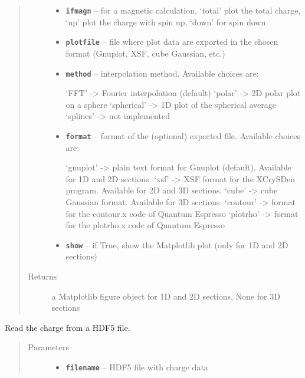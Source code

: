 \documentclass[letterpaper,10pt,english]{sphinxmanual}
\begin{document}
\begin{fulllineitems}
\begin{fulllineitems}
\begin{quote}
\begin{description}
\begin{itemize}
\item {} 
\textbf{\texttt{ifmagn}} -- for a magnetic calculation, `total' plot the total charge, `up' plot the charge with spin up,
`down' for spin down

\item {} 
\textbf{\texttt{plotfile}} -- file where plot data are exported in the chosen format (Gnuplot, XSF, cube Gaussian, etc.)

\item {} 
\textbf{\texttt{method}} -- 
interpolation method. Available choices are:

`FFT' -\textgreater{} Fourier interpolation (default)
`polar' -\textgreater{} 2D polar plot on a sphere
`spherical' -\textgreater{} 1D plot of the spherical average
`splines' -\textgreater{} not implemented


\item {} 
\textbf{\texttt{format}} -- 
format of the (optional) exported file. Available choices are:

`gnuplot' -\textgreater{} plain text format for Gnuplot (default). Available for 1D and 2D sections.
`xsf' -\textgreater{} XSF format for the XCrySDen program. Available for 2D and 3D sections.
`cube' -\textgreater{} cube Gaussian format. Available for 3D sections.
`contour' -\textgreater{} format for the contour.x code of Quantum Espresso
`plotrho' -\textgreater{} format for the plotrho.x code of Quantum Espresso


\item {} 
\textbf{\texttt{show}} -- if True, show the Matplotlib plot (only for 1D and 2D sections)

\end{itemize}

\item[{Returns}] \leavevmode
a Matplotlib figure object for 1D and 2D sections, None for 3D sections

\end{description}\end{quote}

\end{fulllineitems}


\begin{fulllineitems}
\label{postqe:postqe.charge.Charge.read}
Read the charge from a HDF5 file.
\begin{quote}\begin{description}
\item[{Parameters}] \leavevmode\begin{itemize}
\item {} 
\textbf{\texttt{filename}} -- HDF5 file with charge data


\end{itemize}
\end{description}
\end{quote}
\end{fulllineitems}
\end{fulllineitems}
\end{document}
